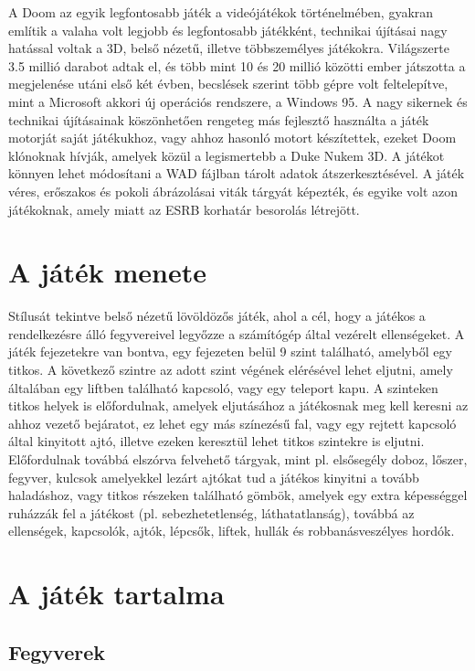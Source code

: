 \documentclass{thesis-ekf}
\theoremstyle{definition}
\theoremstyle{remark}
\begin{document}
A Doom az egyik legfontosabb játék a videójátékok történelmében, gyakran említik
a valaha volt legjobb és legfontosabb játékként, technikai újításai nagy
hatással voltak a 3D, belső nézetű, illetve többszemélyes játékokra. Világszerte
3.5 millió darabot adtak el, és több mint 10 és 20 millió közötti ember
játszotta a megjelenése utáni első két évben, becslések szerint több gépre volt
feltelepítve, mint a Microsoft akkori új operációs rendszere, a Windows 95. A
nagy sikernek és technikai újításainak köszönhetően rengeteg más fejlesztő
használta a játék motorját saját játékukhoz, vagy ahhoz hasonló motort
készítettek, ezeket Doom klónoknak hívják, amelyek közül a legismertebb a Duke
Nukem 3D. A játékot könnyen lehet módosítani a WAD fájlban tárolt adatok
átszerkesztésével. A játék véres, erőszakos és pokoli ábrázolásai viták tárgyát
képezték, és egyike volt azon játékoknak, amely miatt az ESRB korhatár besorolás
létrejött.

\section{A játék menete}

Stílusát tekintve belső nézetű lövöldözős játék, ahol a cél, hogy a játékos a
rendelkezésre álló fegyvereivel legyőzze a számítógép által vezérelt
ellenségeket. A játék fejezetekre van bontva, egy fejezeten belül 9 szint
található, amelyből egy titkos. A következő szintre az adott szint végének
elérésével lehet eljutni, amely általában egy liftben található kapcsoló, vagy
egy teleport kapu. A szinteken titkos helyek is előfordulnak, amelyek
eljutásához a játékosnak meg kell keresni az ahhoz vezető bejáratot, ez lehet
egy más színezésű fal, vagy egy rejtett kapcsoló által kinyitott ajtó, illetve
ezeken keresztül lehet titkos szintekre is eljutni. Előfordulnak továbbá
elszórva felvehető tárgyak, mint pl. elsősegély doboz, lőszer, fegyver, kulcsok
amelyekkel lezárt ajtókat tud a játékos kinyitni a tovább haladáshoz, vagy
titkos részeken található gömbök, amelyek egy extra képességgel ruházzák fel a
játékost (pl. sebezhetetlenség, láthatatlanság), továbbá az ellenségek,
kapcsolók, ajtók, lépcsők, liftek, hullák és robbanásveszélyes hordók.

\section{A játék tartalma}

\subsection{Fegyverek}
\end{document}
